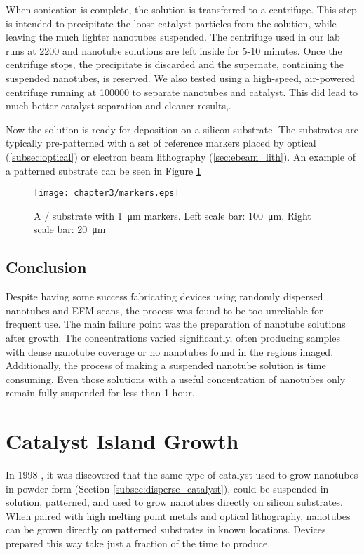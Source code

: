When sonication is complete, the solution is transferred to a centrifuge. This step is intended to precipitate the loose catalyst particles from the solution, while leaving the much lighter nanotubes suspended. The centrifuge used in our lab runs at \SI{2200}{\rpm} and nanotube solutions are left inside for 5-10 minutes. Once the centrifuge stops, the precipitate is discarded and the supernate, containing the suspended nanotubes, is reserved. We also tested using a high-speed, air-powered centrifuge running at \SI{100000}{\rpm} to separate nanotubes and catalyst. This did lead to much better catalyst separation and cleaner results,.

Now the solution is ready for deposition on a silicon substrate. The substrates are typically pre-patterned with a set of reference markers placed by optical (\ref{subsec:optical}) or electron beam lithography (\ref{sec:ebeam_lith}). An example of a patterned substrate can be seen in Figure \ref{fig:markers}

\begin{figure}
    \centering
    \texttt{[image: chapter3/markers.eps]}
    \caption{A / substrate with \SI{1}{\micro\meter}  markers. Left scale bar: \SI{100}{\micro\meter}. Right scale bar: \SI{20}{\micro\meter} }
    \label{fig:markers}
\end{figure}

\subsection{Conclusion}

Despite having some success fabricating devices using randomly dispersed nanotubes and EFM scans, the process was found to be too unreliable for frequent use. The main failure point was the preparation of nanotube solutions after growth. The concentrations varied significantly, often producing samples with dense nanotube coverage or no nanotubes found in the regions imaged. Additionally, the process of making a suspended nanotube solution is time consuming. Even those solutions with a useful concentration of nanotubes only remain fully suspended for less than 1 hour.

\section{Catalyst Island Growth}
\label{subsec:catalyst_island}

In 1998 \cite{Kong1998a}, it was discovered that the same type of catalyst used to grow nanotubes in powder form (Section \ref{subsec:disperse_catalyst}), could be suspended in solution, patterned, and used to grow nanotubes directly on silicon substrates. When paired with high melting point metals and optical lithography, nanotubes can be grown directly on patterned substrates in known locations. Devices prepared this way take just a fraction of the time to produce. 

